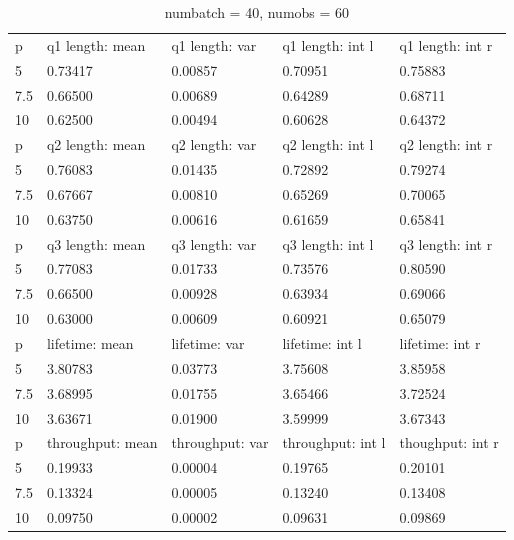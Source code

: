 \documentclass[a4paper,11pt]{article}
\begin{document}
\begin{table}[H]
\begin{tabular}{lllll}
    \rowcolor{LightPurple}
    p & q1 length: mean & q1 length: var & q1 length: int l & q1 length: int r \\
    \rowcolor{Gray}
    5 & 0.73417 & 0.00857 & 0.70951 & 0.75883 \\ 
    7.5 & 0.66500 & 0.00689 & 0.64289 & 0.68711 \\
    \rowcolor{LightCyan}
    10 & 0.62500 & 0.00494 & 0.60628 & 0.64372 \\
    
    \rowcolor{LightPurple}
    p & q2 length: mean & q2 length: var & q2 length: int l & q2 length: int r \\
    \rowcolor{Gray}
    5 & 0.76083 & 0.01435 & 0.72892 & 0.79274 \\
    7.5 & 0.67667 & 0.00810 & 0.65269 & 0.70065 \\
    \rowcolor{LightCyan}
    10 & 0.63750 & 0.00616 & 0.61659 & 0.65841 \\
    
    \rowcolor{LightPurple}
    p & q3 length: mean & q3 length: var & q3 length: int l & q3 length: int r \\
    \rowcolor{Gray}
    5 & 0.77083 & 0.01733 & 0.73576 & 0.80590 \\
    7.5 & 0.66500 & 0.00928 & 0.63934 & 0.69066 \\
    \rowcolor{LightCyan}
    10 & 0.63000 & 0.00609 & 0.60921 & 0.65079 \\
    
    \rowcolor{LightPurple}
    p & lifetime: mean & lifetime: var & lifetime: int l & lifetime: int r \\
    \rowcolor{Gray}
    5 & 3.80783 & 0.03773 & 3.75608 & 3.85958 \\
    7.5 & 3.68995 & 0.01755 & 3.65466 & 3.72524 \\
    \rowcolor{LightCyan}
    10 & 3.63671 & 0.01900 & 3.59999 & 3.67343 \\
    
    \rowcolor{LightPurple}
    p & throughput: mean & throughput: var & throughput: int l & thoughput: int r \\ 
    \rowcolor{Gray}
    5 & 0.19933 & 0.00004 & 0.19765 & 0.20101 \\
    7.5 & 0.13324 & 0.00005 & 0.13240 & 0.13408 \\
    \rowcolor{LightCyan}
    10 & 0.09750 & 0.00002 & 0.09631 & 0.09869 \\
\end{tabular}
\caption{numbatch = 40, numobs = 60} \label{tab:tab1}
\end{table}
\end{document}

